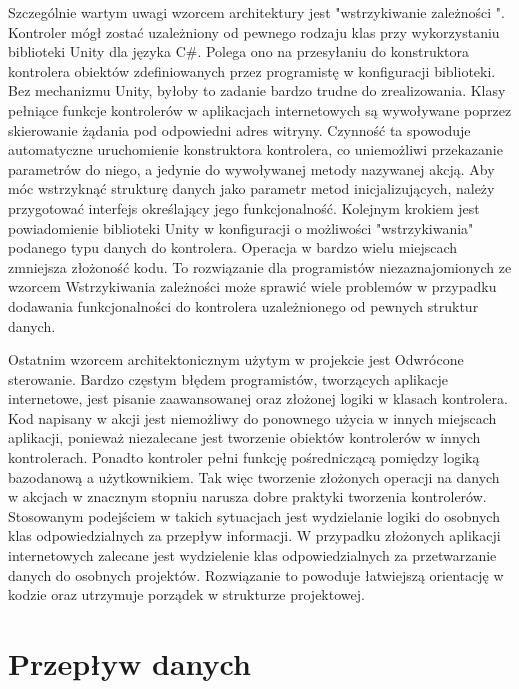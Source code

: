 {Szczególnie wartym uwagi wzorcem architektury jest "wstrzykiwanie zależności ". Kontroler mógł zostać uzależniony od pewnego rodzaju klas przy wykorzystaniu biblioteki Unity dla języka C\#. Polega ono na przesyłaniu do konstruktora kontrolera obiektów zdefiniowanych przez programistę w konfiguracji biblioteki. Bez mechanizmu Unity, byłoby to zadanie bardzo trudne do zrealizowania. Klasy pełniące funkcje kontrolerów w aplikacjach internetowych są wywoływane poprzez skierowanie żądania pod odpowiedni adres witryny. Czynność ta spowoduje automatyczne uruchomienie konstruktora kontrolera, co uniemożliwi przekazanie parametrów do niego, a jedynie do wywoływanej metody nazywanej akcją. Aby móc wstrzyknąć strukturę danych jako parametr metod inicjalizujących, należy przygotować interfejs określający jego funkcjonalność. Kolejnym krokiem jest powiadomienie biblioteki Unity w konfiguracji o możliwości "wstrzykiwania" podanego typu danych do kontrolera. Operacja w bardzo wielu miejscach zmniejsza złożoność kodu. To rozwiązanie dla programistów niezaznajomionych ze wzorcem Wstrzykiwania zależności może sprawić wiele problemów w przypadku dodawania funkcjonalności do kontrolera uzależnionego od pewnych struktur danych.

Ostatnim wzorcem architektonicznym użytym w projekcie jest Odwrócone sterowanie. Bardzo częstym błędem programistów, tworzących aplikacje internetowe, jest pisanie zaawansowanej oraz złożonej logiki w klasach kontrolera. Kod napisany w akcji jest niemożliwy do ponownego użycia w innych miejscach aplikacji, ponieważ niezalecane jest tworzenie obiektów kontrolerów w innych kontrolerach. Ponadto kontroler pełni funkcję pośredniczącą pomiędzy logiką bazodanową a użytkownikiem. Tak więc tworzenie złożonych operacji na danych w akcjach w znacznym stopniu narusza dobre praktyki tworzenia kontrolerów. Stosowanym podejściem w takich sytuacjach jest wydzielanie logiki do osobnych klas odpowiedzialnych za przepływ informacji. W przypadku złożonych aplikacji internetowych zalecane jest wydzielenie klas odpowiedzialnych za przetwarzanie danych do osobnych projektów. Rozwiązanie to powoduje łatwiejszą orientację w kodzie oraz utrzymuje porządek w strukturze projektowej.
}

\section{Przepływ danych}

